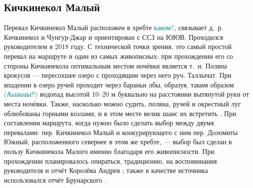\subsection{Кичкинекол Малый} 
Перевал Кичкинекол Малый расположен в хребте \textcolor{teal}{каком?}, связывает д.~р. Кичкинекол и Чунгур-Джар и ориентирован с ССЗ на ЮЮВ. Проходился руководителем в 2018 году. С технической точки зрения, это самый простой перевал на маршруте и один из самых живописных: при прохождении его со стороны Кичкинекола оптимальным местом ночёвки является т.~н. Поляна крокусов --- пересохшее озеро с проходящим через него руч. Таллычат. При впадении в озеро ручей проходит через бараньи лбы, образуя, таким образом \textcolor{teal}{(Аыаыаы!!)} водопад высотой 10--20 м буквально на расстоянии вытянутой руки от места ночёвки. Также, насколько можно судить, поляна, ручей и окрестный луг облюбованы горными козлами, и в этом месте велик шанс их встретить \cite{Korolyov2018}. При составлении маршрута, когда нужно было сделать выбор между двумя перевалами: пер. Кичкинекол Малый и конкурирующего с ним пер. Доломиты Южный, расположенного севернее в этом же хребте, --- выбор был сделан в пользу Кичкинекола Малого именно благодаря его живописности. При прохождении планировалось опираться, традиционно, на воспоминания руководителя и отчёт Королёва Андрея \cite{Korolyov2018}; также в качестве источника использовался отчёт Брунарского \cite{Brunarsky}. 